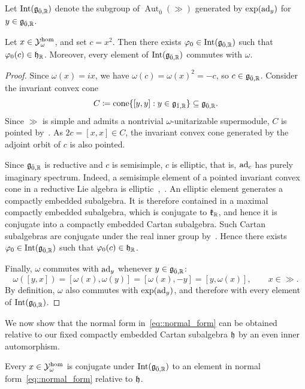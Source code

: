 Let $\operatorname{Int}({\mathfrak{g}}_{\bar0,{\mathbb R}})$ denote the subgroup of $\operatorname{Aut}_{\bar0}(\gg)$ generated by $\exp(\operatorname{ad}_y)$ for $y\in{\mathfrak{g}}_{\bar0,{\mathbb R}}$.

\begin{lemma}\label{lemm::conjugation_inner}
Let $x\in{\mathcal Y}_\omega^{\hom}$, and set $c=x^2$. Then there exists $\varphi_0\in\operatorname{Int}({\mathfrak{g}}_{\bar0,{\mathbb R}})$ such that $\varphi_0(c)\in {\mathfrak h}_{{\mathbb R}}$. Moreover, every element of $\operatorname{Int}({\mathfrak{g}}_{\bar0,{\mathbb R}})$ commutes with $\omega$.
\end{lemma}

\begin{proof}
Since $\omega(x)=ix$, we have $\omega(c)=\omega(x)^2=-c$, so $c\in{\mathfrak{g}}_{\bar0,{\mathbb R}}$. Consider the invariant convex cone
\[
C\coloneqq\operatorname{cone}\{[y,y]:y\in{\mathfrak{g}}_{\bar1,{\mathbb R}}\}
\subseteq{\mathfrak{g}}_{\bar0,{\mathbb R}}.
\]
Since $\gg$ is simple and admits a nontrivial $\omega$-unitarizable supermodule, $C$ is pointed by~\cite[Proposition~6.1.2(a)]{neeb2011lie}. As $2c=[x,x]\in C$, the invariant convex cone generated by the adjoint orbit of $c$ is also pointed.

Since ${\mathfrak{g}}_{\bar0,{\mathbb R}}$ is reductive and $c$ is semisimple, $c$ is elliptic, that is, $\operatorname{ad}_c$ has purely imaginary spectrum. Indeed, a semisimple element of a pointed invariant convex cone in a reductive Lie algebra is elliptic~\cite[Proposition~3.10]{Neeb_Oeh},~\cite[Theorem~1.2]{NeebOlshanskii}. An elliptic element generates a compactly embedded subalgebra. It is therefore contained in a maximal compactly embedded subalgebra, which is conjugate to ${\mathfrak k}_{{\mathbb R}}$, and hence it is conjugate into a compactly embedded Cartan subalgebra. Such Cartan subalgebras are conjugate under the real inner group by~\cite[Proposition~6.61]{Knapp}. Hence there exists $\varphi_0\in\operatorname{Int}({\mathfrak{g}}_{\bar0,{\mathbb R}})$ such that $\varphi_0(c)\in {\mathfrak h}_{{\mathbb R}}$.

Finally, $\omega$ commutes with $\operatorname{ad}_{y}$ whenever $y \in {\mathfrak{g}}_{\bar{0},{\mathbb R}}$: 
\[
\omega([y,x])=[\omega(x),\omega(y)]=[\omega(x),-y]=[y,\omega(x)], \qquad x \in \gg.
\]
By definition, $\omega$ also commutes with $\exp(\operatorname{ad}_y)$, and therefore with every element of $\operatorname{Int}({\mathfrak{g}}_{\bar0,{\mathbb R}})$. 
\end{proof}

We now show that the normal form in~\eqref{eq::normal_form} can be obtained relative to our fixed compactly embedded Cartan subalgebra ${\mathfrak h}$ by an even inner automorphism.

\begin{lemma}\label{lemm::omega_fixed_cartan_normal_form}
Every $x\in{\mathcal Y}_\omega^{\hom}$ is conjugate under $\operatorname{Int}({\mathfrak{g}}_{\bar0,{\mathbb R}})$ to an element in normal form~\eqref{eq::normal_form} relative to ${\mathfrak h}$.
\end{lemma}



